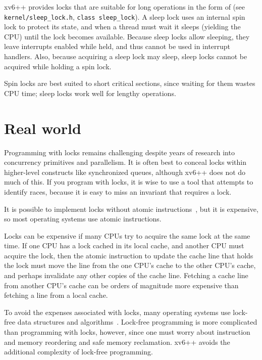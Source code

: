xv6++ provides locks that are suitable for long operations in the form of
(see \texttt{kernel/sleep\_lock.h}, \texttt{class sleep\_lock}).
A sleep lock uses an internal spin lock to protect its state, and when a thread
must wait it sleeps (yielding the CPU) until the lock becomes available.
Because sleep locks allow sleeping, they leave interrupts enabled while held, and
thus cannot be used in interrupt handlers. Also, because acquiring a sleep lock
may sleep, sleep locks cannot be acquired while holding a spin lock.

Spin locks are best suited to short critical sections,
since waiting for them wastes CPU time;
sleep locks work well for lengthy operations.

\section{Real world}

Programming with locks remains challenging despite years of research
into concurrency primitives and parallelism.
It is often best to conceal locks within
higher-level constructs like synchronized queues, although xv6++ does not
do much of this. If you program with locks, it is wise to use a tool that attempts to
identify races, because it is easy to miss an invariant that requires
a lock.

It is possible to implement locks without atomic
instructions~\cite{lamport:bakery}, but it is expensive, so most
operating systems use atomic instructions.

Locks can be expensive if many CPUs try to acquire the same lock
at the same time. If one CPU has a lock cached in its local cache, and another CPU
must acquire the lock, then the atomic instruction to update the cache line that
holds the lock must move the line from the one CPU's cache to the other CPU's cache,
and perhaps invalidate any other copies of the cache line. Fetching a cache line from
another CPU's cache can be orders of magnitude more expensive than
fetching a line from a local cache.

To avoid the expenses associated with locks, many operating systems
use lock-free data structures and algorithms~\cite{herlihy:art,mckenney:rcuusage}.
Lock-free programming is more complicated than programming with locks, however,
since one must worry about instruction and memory reordering and safe memory
reclamation. xv6++ avoids the additional complexity of lock-free programming.


